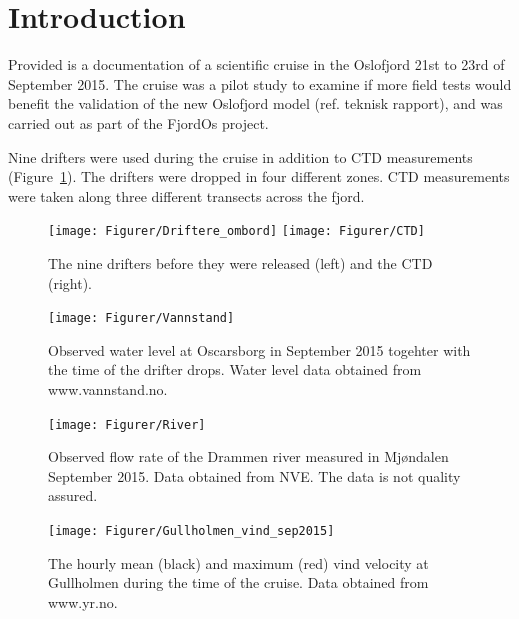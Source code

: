 \documentclass[12pt,a4paper,english]{article}
\begin{document}
\clearpage
\tableofcontents

\clearpage

\section{Introduction}
Provided is a documentation of a scientific cruise in the Oslofjord 21st to 23rd of September 2015. The cruise was a pilot study to examine if more field tests would benefit the validation of the new Oslofjord model (ref. teknisk rapport), and was carried out as part of the FjordOs project.


Nine drifters were used during the cruise in addition to CTD measurements (Figure~\ref{fig:Utstyr}). The drifters were dropped in four different zones. CTD measurements were taken along three different transects across the fjord. %

\begin{figure}[b]
\centerline{
\texttt{[image: Figurer/Driftere\_ombord]}
\texttt{[image: Figurer/CTD]}
}
\caption{\small
The nine drifters before they were released (left) and the CTD (right).}
\label{fig:Utstyr}
\end{figure}

\begin{figure}[tb]
\centerline{
\texttt{[image: Figurer/Vannstand]}}
\caption{\small
Observed water level at Oscarsborg in September 2015 togehter with the time of the drifter drops. Water level data obtained from www.vannstand.no.}
\label{fig:Waterlevel}
\end{figure}

\begin{figure}[tb]
\centerline{
\texttt{[image: Figurer/River]}}
\caption{\small
Observed flow rate of the Drammen river measured in Mj\o ndalen September 2015. Data obtained from NVE. The data is not quality assured.}
\label{fig:River}
\end{figure}

\begin{figure}[tb]
\centerline{
\texttt{[image: Figurer/Gullholmen\_vind\_sep2015]}}
\caption{\small
The hourly mean (black) and maximum (red) vind velocity at Gullholmen during the time of the cruise. Data obtained from www.yr.no.}
\label{fig:Wind}
\end{figure}
\end{document}
